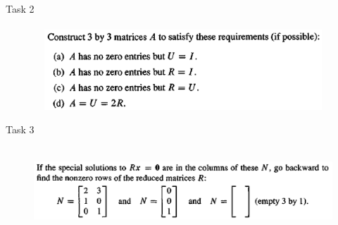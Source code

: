 \documentclass[aspectratio=169]{beamer}
\begin{document}
\begin{frame}[t]{Task 2}
    \framesubtitle{}
    \begin{figure}[H]
        \centering\includegraphics[height=3cm,width=1\textwidth,keepaspectratio]{2.png}
        \label{fig:2.png}
    \end{figure}
\end{frame}

\begin{frame}[t]{Task 3}
    \framesubtitle{}
    \begin{figure}[H]
        \centering\includegraphics[height=3cm,width=1\textwidth,keepaspectratio]{3.png}
        \label{fig:3.png}
    \end{figure}
\end{frame}
\end{document}

